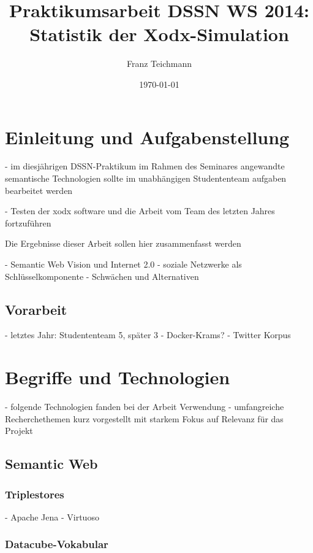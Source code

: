 \documentclass{article}
\title{Praktikumsarbeit DSSN WS 2014: \\ Statistik der Xodx-Simulation}
\author{Franz Teichmann}
\date{\today}
\begin{document}
\maketitle

\tableofcontents
\newpage


\section{Einleitung und Aufgabenstellung}

- im diesjährigen DSSN-Praktikum im Rahmen des Seminares angewandte semantische Technologien sollte im unabhängigen Studententeam
aufgaben bearbeitet werden

- Testen der xodx software und die Arbeit vom Team des letzten Jahres fortzuführen

Die Ergebnisse dieser Arbeit sollen hier zusammenfasst werden


- Semantic Web Vision und Internet 2.0
- soziale Netzwerke als Schlüsselkomponente
- Schwächen und Alternativen

\subsection{Vorarbeit}

- letztes Jahr: Studententeam 5, später 3
- Docker-Krams?
- Twitter Korpus


\section{Begriffe und Technologien}

- folgende Technologien fanden bei der Arbeit Verwendung
- umfangreiche Recherchethemen kurz vorgestellt mit starkem Fokus auf Relevanz für das Projekt

\subsection{Semantic Web}

\subsubsection{Triplestores}

- Apache Jena
- Virtuoso

\subsubsection{Datacube-Vokabular}
\end{document}
